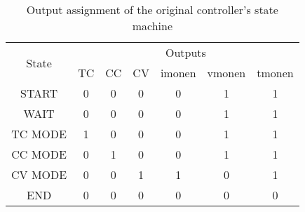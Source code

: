 \documentclass[12pt]{article}
\begin{document}
\begin{table}[H]
\centering
\begin{tabular}{|c|cccccc|}
\hline
\multirow{2}{*}{State} & \multicolumn{6}{c|}{Outputs}                                                                                                   \\ \cline{2-7} 
 & \multicolumn{1}{c|}{TC} & \multicolumn{1}{c|}{CC} & \multicolumn{1}{c|}{CV} & \multicolumn{1}{c|}{imonen} & \multicolumn{1}{c|}{vmonen} & tmonen \\ \hline
START                  & \multicolumn{1}{c|}{0} & \multicolumn{1}{c|}{0} & \multicolumn{1}{c|}{0} & \multicolumn{1}{c|}{0} & \multicolumn{1}{c|}{1} & 1 \\ \hline
WAIT                   & \multicolumn{1}{c|}{0} & \multicolumn{1}{c|}{0} & \multicolumn{1}{c|}{0} & \multicolumn{1}{c|}{0} & \multicolumn{1}{c|}{1} & 1 \\ \hline
TC MODE                & \multicolumn{1}{c|}{1} & \multicolumn{1}{c|}{0} & \multicolumn{1}{c|}{0} & \multicolumn{1}{c|}{0} & \multicolumn{1}{c|}{1} & 1 \\ \hline
CC MODE                & \multicolumn{1}{c|}{0} & \multicolumn{1}{c|}{1} & \multicolumn{1}{c|}{0} & \multicolumn{1}{c|}{0} & \multicolumn{1}{c|}{1} & 1 \\ \hline
CV MODE                & \multicolumn{1}{c|}{0} & \multicolumn{1}{c|}{0} & \multicolumn{1}{c|}{1} & \multicolumn{1}{c|}{1} & \multicolumn{1}{c|}{0} & 1 \\ \hline
END                    & \multicolumn{1}{c|}{0} & \multicolumn{1}{c|}{0} & \multicolumn{1}{c|}{0} & \multicolumn{1}{c|}{0} & \multicolumn{1}{c|}{0} & 0 \\ \hline
\end{tabular}
\caption{Output assignment of the original controller's state machine}
\label{tab:ogCont_outputs}
\end{table}
\end{document}
